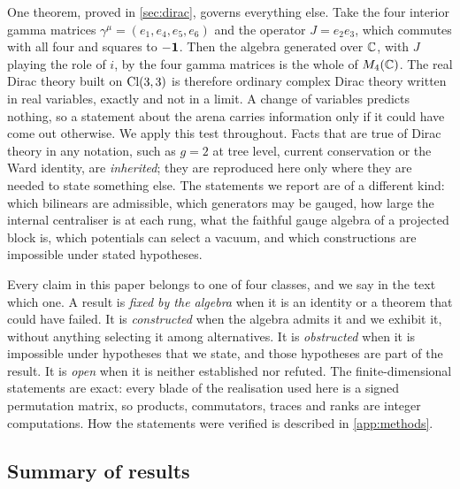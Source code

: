 One theorem, proved in \cref{sec:dirac}, governs everything else. Take the four interior gamma matrices
$\gamma^\mu=(e_1,e_4,e_5,e_6)$ and the operator $J=e_2e_3$, which commutes with all four and squares to $-\mathbf 1$. Then the
algebra generated over $\mathbb{C}$, with $J$ playing the role of $i$, by the four gamma matrices is the whole of $M_4(\mathbb{C})$. The
real Dirac theory built on $\mathrm{Cl}(3,3)$ is therefore ordinary complex Dirac theory written in real variables, exactly and
not in a limit. A change of variables predicts nothing, so a statement about the arena carries information only if it
could have come out otherwise. We apply this test throughout. Facts that are true of Dirac theory in any notation, such as
$g=2$ at tree level, current conservation or the Ward identity, are \emph{inherited}; they are reproduced here only where
they are needed to state something else. The statements we report are of a different kind: which bilinears are admissible,
which generators may be gauged, how large the internal centraliser is at each rung, what the faithful gauge algebra of a
projected block is, which potentials can select a vacuum, and which constructions are impossible under stated
hypotheses.

Every claim in this paper belongs to one of four classes, and we say in the text which one. A result is \emph{fixed by the
algebra} when it is an identity or a theorem that could have failed. It is \emph{constructed} when the algebra admits it
and we exhibit it, without anything selecting it among alternatives. It is \emph{obstructed} when it is impossible under
hypotheses that we state, and those hypotheses are part of the result. It is \emph{open} when it is neither established
nor refuted. The finite-dimensional statements are exact: every blade of the realisation used here is a signed
permutation matrix, so products, commutators, traces and ranks are integer computations. How the statements were verified
is described in \cref{app:methods}.

\subsection{Summary of results}

